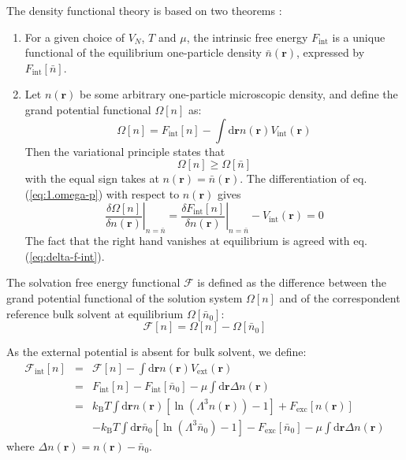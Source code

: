 The density functional theory is based on two theorems :
\begin{enumerate}
\item For a given choice of $V_{N}$, $T$ and $\mu$, the intrinsic free
energy $F_{\mathrm{int}}$ is a unique functional of the equilibrium
one-particle density $\bar{n}(\mathbf{r})$, expressed by $F_{\mathrm{int}}[\bar{n}]$.
\item Let $n(\mathbf{r})$ be some arbitrary one-particle microscopic density,
and define the grand potential functional $\varOmega[n]$ as:
\begin{equation}
\varOmega[n]=F_{\mathrm{int}}[n]-\int\mathrm{d}\mathbf{r}n(\mathbf{r})V_{\mathrm{int}}(\mathbf{r})\label{eq:1.omega-p}
\end{equation}
Then the variational principle states that
\begin{equation}
\varOmega[n]\geq\varOmega[\bar{n}]
\end{equation}
with the equal sign takes at $n(\mathbf{r})=\bar{n}(\mathbf{r})$.
The differentiation of eq. (\ref{eq:1.omega-p}) with respect to $n(\mathbf{r})$
gives
\begin{equation}
\left.\frac{\delta\varOmega[n]}{\delta n(\mathbf{r})}\right|_{n=\bar{n}}=\left.\frac{\delta F_{\mathrm{int}}[n]}{\delta n(\mathbf{r})}\right|_{n=\bar{n}}-V_{\mathrm{int}}(\mathbf{r})=0\label{eq:1.26}
\end{equation}
The fact that the right hand vanishes at equilibrium is agreed with
eq. (\ref{eq:delta-f-int}).
\end{enumerate}
The solvation free energy functional $\mathcal{F}$ is defined as the difference between the grand potential functional
of the solution system $\varOmega[n]$ and of the correspondent reference
bulk solvent at equilibrium $\varOmega[\bar{n}_{0}]$:
\begin{equation}
\mathcal{F}[n]=\varOmega[n]-\varOmega[\bar{n}_{0}]\label{eq:1.def.functional}
\end{equation}

As the external potential is absent for bulk solvent, we define:
\begin{eqnarray}
\mathcal{F}_{\mathrm{int}}[n] & = & \mathcal{F}[n]-\int\mathrm{d}\mathbf{r}n(\mathbf{r})V_{\mathrm{ext}}(\mathbf{r})\\
 & = & F_{\mathrm{int}}[n]-F_{\mathrm{int}}[\bar{n}_{0}]-\mu\int\mathrm{d}\mathbf{r}\Delta n(\mathbf{r})\nonumber \\
 & = & k_{\mathrm{B}}T\int\mathrm{d}\mathbf{r}n(\mathbf{r})\left[\ln\left(\Lambda^{3}n(\mathbf{r})\right)-1\right]+F_{\mathrm{exc}}\left[n(\mathbf{r})\right]\\
 &  & -k_{\mathrm{B}}T\int\mathrm{d}\mathbf{r}\bar{n}_{0}\left[\ln\left(\Lambda^{3}\bar{n}_{0}\right)-1\right]-F_{\mathrm{exc}}\left[\bar{n}_{0}\right]-\mu\int\mathrm{d}\mathbf{r}\Delta n(\mathbf{r})\nonumber 
\end{eqnarray}
where $\Delta n(\mathbf{r})=n(\mathbf{r})-\bar{n}_{0}$.

